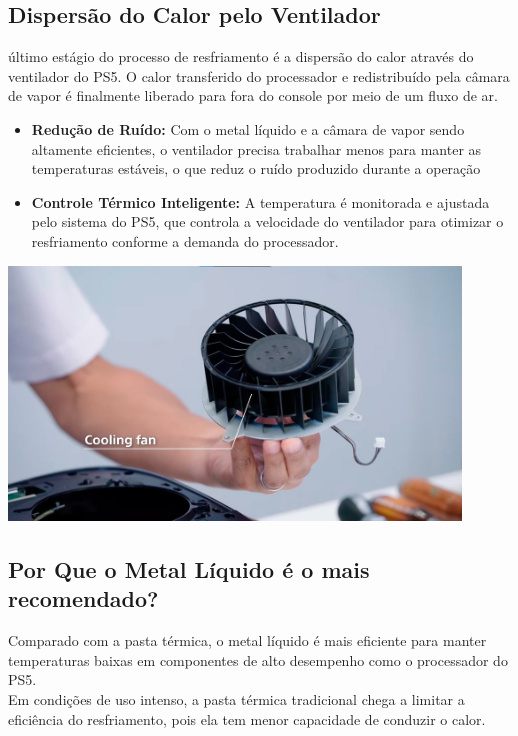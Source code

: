 \documentclass[12pt]{article}
\begin{document}
\subsection{Dispersão do Calor pelo Ventilador}
último estágio do processo de resfriamento é a dispersão do calor através do ventilador do PS5. O calor transferido do processador e redistribuído pela câmara de vapor é finalmente liberado para fora do console por meio de um fluxo de ar.
\begin{itemize}
    \item \textbf{Redução de Ruído: } Com o metal líquido e a câmara de vapor sendo altamente eficientes, o ventilador precisa trabalhar menos para manter as temperaturas estáveis, o que reduz o ruído produzido durante a operação
    \item \textbf{Controle Térmico Inteligente:}  A temperatura é monitorada e ajustada pelo sistema do PS5, que controla a velocidade do ventilador para otimizar o resfriamento conforme a demanda do processador.
\end{itemize}
\begin{adjustbox}{center,caption={Fan utilizada no playstation 5 (Imagem: PlayStation/Reprodução)},nofloat=figure,vspace=\bigskipamount}
    \centering
    \includegraphics[width=12cm]{ventoinha.png}
\end{adjustbox}
\subsection{ Por Que o Metal Líquido é o mais recomendado?}
Comparado com a pasta térmica, o metal líquido é mais eficiente para manter temperaturas baixas em componentes de alto desempenho como o processador do PS5. \\
Em condições de uso intenso, a pasta térmica tradicional chega a limitar a eficiência do resfriamento, pois ela tem menor capacidade de conduzir o calor.\\
\end{document}
